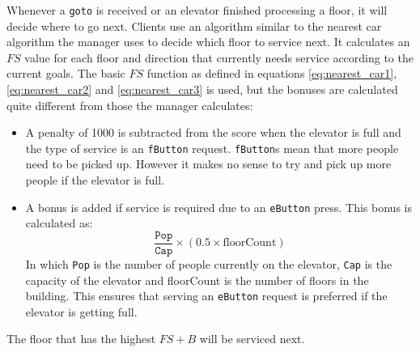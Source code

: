 \documentclass[a4paper,10pt,twocolumn]{article}
\begin{document}
Whenever a \texttt{goto} is received or an elevator finished processing a floor, it will decide where to go next. Clients use an algorithm similar to the nearest car algorithm the manager uses to decide which floor to service next. It calculates an $FS$ value for each floor and direction that currently needs service according to the current goals. The basic $FS$ function as defined in equations \ref{eq:nearest_car1}, \ref{eq:nearest_car2} and \ref{eq:nearest_car3} is used, but the bonuses are calculated quite different from those the manager calculates:
\begin{itemize}
 \item A penalty of 1000 is subtracted from the score when the elevator is full and the type of service is an \texttt{fButton} request. \texttt{fButton}s mean that more people need to be picked up. However it makes no sense to try and pick up more people if the elevator is full.
 \item A bonus is added if service is required due to an \texttt{eButton} press. This bonus is calculated as:
 \begin{equation}
  \frac{\texttt{Pop}}{\texttt{Cap}} \times (0.5 \times \text{floorCount})
 \end{equation}
 In which \texttt{Pop} is the number of people currently on the elevator, \texttt{Cap} is the capacity of the elevator and floorCount is the number of floors in the building. This ensures that serving an \texttt{eButton} request is preferred if the elevator is getting full. 
\end{itemize}
The floor that has the highest $FS + B$ will be serviced next. 
\end{document}
